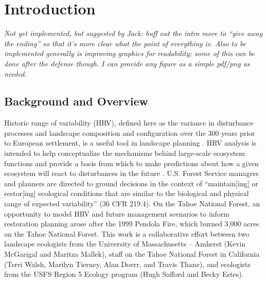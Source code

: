 
\chapter{Introduction}

\emph{Not yet implemented, but suggested by Jack: buff out the intro more to ``give away the ending'' so that it's more clear what the point of everything is. Also to be implemented generally is improving graphics for readability; some of this can be done after the defense though. I can provide any figure as a simple pdf/png as needed.}
\section{Background and Overview}

Historic range of variability (HRV), defined here as the variance in disturbance processes and landscape composition and configuration over the 300 years prior to European settlement, is a useful tool in landscape planning \citep{Nonaka2005}. HRV analysis is intended to help conceptualize the mechanisms behind large-scale ecosystem functions and provide a basis from which to make predictions about how a given ecosystem will react to disturbances in the future \citep{Nonaka2005,Landres1999}. U.S. Forest Service managers and planners are directed to ground decisions in the context of ``maintain[ing] or restor[ing] ecological conditions that are similar to the biological and physical range of expected variability'' (36 CFR 219.4). On the Tahoe National Forest, an opportunity to model HRV and future management scenarios to inform restoration planning arose after the 1999 Pendola Fire, which burned 3,000 acres on the Tahoe National Forest. This work is a collaborative effort between two landscape ecologists from the University of Massachusetts -- Amherst (Kevin McGarigal and Maritza Mallek), staff on the Tahoe National Forest in California (Terri Walsh, Marilyn Tierney, Alan Doerr, and Travis Thane), and ecologists from the USFS Region 5 Ecology program (Hugh Safford and Becky Estes).

